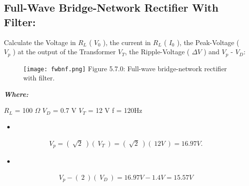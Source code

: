 \subsection{Full-Wave Bridge-Network Rectifier With Filter:}

Calculate the Voltage in $R_{L}$ ( $V_{0}$ ), the current in $R_{L}$ ( $I_{0}$ ), the Peak-Voltage ( $V_{p}$ ) at the output of the Transformer $V_{T}$, the Ripple-Voltage ( $\Delta V$ ) and $V_{p}$ - $V_{D}$:

\begin{figure}[H]
\texttt{[image: fwbnf.png]}
\centering \linebreak \linebreak Figure 5.7.0: Full-wave bridge-network rectifier with filter.
\end{figure}

{\bfseries\itshape Where:
\begin{tasks}
\task $R_{L}$ = 100 $\Omega$
\task $V_{D}$ = 0.7 V
\task $V_{T}$ = 12 V
\task f = 120Hz 
\end{tasks}} \hfill

{\bfseries\itshape\color{Maroon}{Solution:}} \hfill \break

\begin{itemize}
\item {\bfseries\itshape\color{Violet}{For peak voltage at the transformer output:}} \hfill \break
{\bfseries\itshape{}}
\end{itemize}

\begin{ceqn}
\begin{align}
V_{p} = (\ \sqrt{2}\ )(\ V_{T}\ ) = (\ \sqrt{2}\ )(\ 12 V\ ) = 16.97 V.
\end{align}
\end{ceqn}

\begin{itemize}
\item {\bfseries\itshape{}} \hfill \break
\end{itemize}

\begin{ceqn}
\begin{align}
V_{p} - (\ 2\ )(\ V_{D}\ ) = 16.97V - 1.4V = 15.57 V
\end{align}
\end{ceqn}


